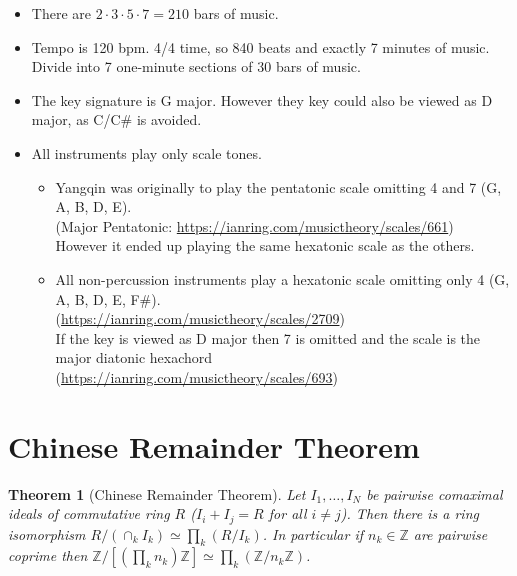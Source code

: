 \documentclass[12pt]{article}
\newtheorem*{theorem}{Theorem}
\begin{document}
\begin{itemize}
\item There are $2\cdot 3\cdot 5\cdot 7 = 210$ bars of music.

\item Tempo is 120 bpm. 4/4 time, so 840 beats and exactly 7 minutes of music.
Divide into 7 one-minute sections of 30 bars of music.

\item The key signature is G major. However they key could also be
  viewed as D major, as C/C\# is avoided.

\item All instruments play only scale tones.

\begin{itemize}
\item Yangqin was originally to play the pentatonic scale omitting 4 and 7 (G, A, B, D, E).
  \\
  (Major Pentatonic: 
  \href{https://ianring.com/musictheory/scales/661}{https://ianring.com/musictheory/scales/661})
  \\
  However it ended up playing the same hexatonic scale as the others.

\item All non-percussion instruments play a hexatonic scale omitting only 4 (G, A, B, D,
  E, F\#). \\
  (\href{https://ianring.com/musictheory/scales/2709}{https://ianring.com/musictheory/scales/2709})\\
  If the key is viewed as D major then 7 is omitted and the scale is the major diatonic hexachord\\
  (\href{https://ianring.com/musictheory/scales/693}{https://ianring.com/musictheory/scales/693})\\
\end{itemize}
\end{itemize}

\section{Chinese Remainder Theorem}

\begin{theorem}[Chinese Remainder Theorem]
  Let $I_1,\ldots,I_N$ be pairwise comaximal ideals of commutative
  ring $R$ ($I_i+I_j = R$ for all $i\ne j$). Then there is a ring
  isomorphism $R / (\cap_k I_k) \simeq \prod_k (R / I_k)$. In
  particular if $n_k \in \mathbb{Z}$ are pairwise coprime then
  $\mathbb{Z} / [(\prod_k n_k)\mathbb{Z}] \simeq \prod_k (\mathbb{Z} /
  n_k\mathbb{Z})$.
\end{theorem}
\end{document}
